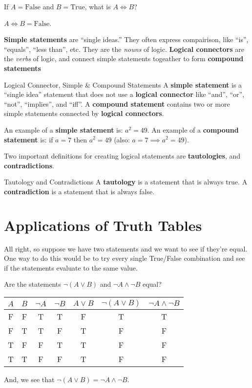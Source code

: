 \begin{boxexample}{}{}
	If $A=\text{False}$ and $B=\text{True}$, what is $A \iff B$?
	
	$A \iff B = \text{False}$.
\end{boxexample}

{\bf Simple statements} are ``single ideas.'' They often express compairison, like ``is'', ``equals'', ``less than'', etc. They are the \emph{nouns} of logic. {\bf Logical connectors} are the \emph{verbs} of logic, and connect simple statements togeather to form {\bf compound statements}

\begin{boxdefine}{Logical Connector, Simple \& Compound Statements}{}
	A {\bf simple statement} is a ``single idea'' statement that does not use a {\bf logical connector} like ``and'', ``or'', ``not'', ``implies'', and ``iff''.
	A {\bf compound statement} contains two or more simple statements connected by {\bf logical connectors}.
\end{boxdefine}

\begin{boxexample}{}{}
	An example of a {\bf simple statement} is: $a^2=49$. An example of a {\bf compound statement} is: if $a=7$ then $a^2=49$ (also: $a=7 \implies a^2=49$). 
\end{boxexample}

Two important definitions for creating logical statements are {\bf tautologies}, and {\bf contradictions}.

\begin{boxdefine}{Tautology and Contradictions}{}
	A {\bf tautology} is a statement that is always true. A {\bf contradiction} is a statement that is always false.
\end{boxdefine}

\section{Applications of Truth Tables}

All right, so suppose we have two statements and we want to see if they're equal. One way to do this would be to try every single True/False combination and see if the statements evaluate to the same value.

\begin{boxexample}{}{}
	Are the statements $\neg (A \lor B)$ and $\neg A \land \neg B$ equal?

	\medskip
	\begin{tabular}{g|g|c|c|c|g|g}
		\hline
		$A$ & $B$ & $\neg A$ & $\neg B$ & $A \lor B$ & $\neg (A \lor B)$ & $\neg A \land \neg B$\\
		\hline
		F & F & T & T & F & T & T\\
		F & T & T & F & T & F & F\\
		T & F & F & T & T & F & F\\
		T & T & F & F & T & F & F\\
		\hline
	\end{tabular}
	\medskip

	And, we see that $\neg (A \lor B) = \neg A \land \neg B$.
\end{boxexample}

